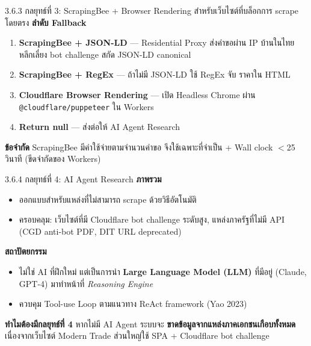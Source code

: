 \documentclass[aspectratio=169,11pt]{beamer}
\begin{document}
\begin{frame}{3.6.3 กลยุทธ์ที่ 3: ScrapingBee + Browser Rendering}
  สำหรับเว็บไซต์ที่บล็อกการ scrape โดยตรง
  \vspace{0.3em}
  \textbf{ลำดับ Fallback}
  \begin{enumerate}
    \item \textbf{ScrapingBee + JSON-LD} --- Residential Proxy ส่งคำขอผ่าน
          IP บ้านในไทย หลีกเลี่ยง bot challenge สกัด JSON-LD canonical
    \item \textbf{ScrapingBee + RegEx} --- ถ้าไม่มี JSON-LD ใช้ RegEx จับ
          ราคาใน HTML
    \item \textbf{Cloudflare Browser Rendering} --- เปิด Headless Chrome
          ผ่าน \texttt{@cloudflare/puppeteer} ใน Workers
    \item \textbf{Return null} --- ส่งต่อให้ AI Agent Research
  \end{enumerate}
  \vspace{0.3em}
  \begin{block}{\textbf{ข้อจำกัด}}
    ScrapingBee มีค่าใช้จ่ายตามจำนวนคำขอ จึงใช้เฉพาะที่จำเป็น
    + Wall clock $<$25 วินาที (ขีดจำกัดของ Workers)
  \end{block}
\end{frame}

\begin{frame}{3.6.4 กลยุทธ์ที่ 4: AI Agent Research}
  \textbf{ภาพรวม}
  \begin{itemize}
    \item ออกแบบสำหรับแหล่งที่ไม่สามารถ scrape ด้วยวิธีอัตโนมัติ
    \item ครอบคลุม: เว็บไซต์ที่มี Cloudflare bot challenge ระดับสูง,
          แหล่งภาครัฐที่ไม่มี API (CGD anti-bot PDF, DIT URL deprecated)
  \end{itemize}
  \vspace{0.3em}
  \textbf{สถาปัตยกรรม}
  \begin{itemize}
    \item ไม่ใช่ AI ที่ฝึกใหม่ แต่เป็นการนำ \textbf{Large Language Model (LLM)}
          ที่มีอยู่ (Claude, GPT-4) มาทำหน้าที่ \emph{Reasoning Engine}
    \item ควบคุม Tool-use Loop ตามแนวทาง ReAct framework (Yao 2023)
  \end{itemize}
  \vspace{0.3em}
  \begin{block}{\textbf{ทำไมต้องมีกลยุทธ์ที่ 4}}
    หากไม่มี AI Agent ระบบจะ \textbf{ขาดข้อมูลจากแหล่งภาคเอกชนเกือบทั้งหมด}
    เนื่องจากเว็บไซต์ Modern Trade ส่วนใหญ่ใช้ SPA + Cloudflare bot challenge
  \end{block}
\end{frame}
\end{document}

